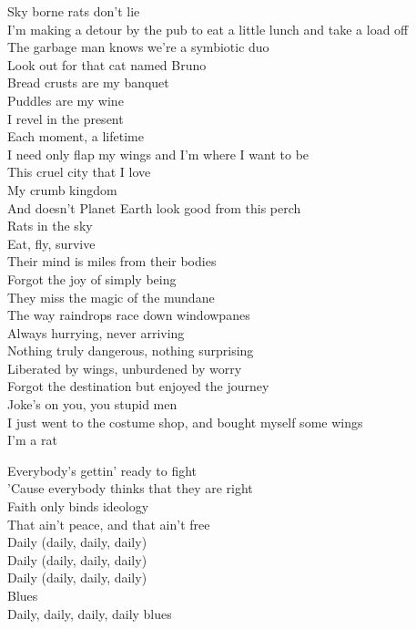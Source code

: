 Sky borne rats don't lie\\
I'm making a detour by the pub to eat a little lunch and take a load off\\
The garbage man knows we're a symbiotic duo\\
Look out for that cat named Bruno\\

Bread crusts are my banquet\\
Puddles are my wine\\
I revel in the present\\
Each moment, a lifetime\\
I need only flap my wings and I'm where I want to be\\
This cruel city that I love\\
My crumb kingdom\\
And doesn't Planet Earth look good from this perch\\
Rats in the sky\\
Eat, fly, survive\\

Their mind is miles from their bodies\\
Forgot the joy of simply being\\
They miss the magic of the mundane\\
The way raindrops race down windowpanes\\
Always hurrying, never arriving\\
Nothing truly dangerous, nothing surprising\\
Liberated by wings, unburdened by worry\\
Forgot the destination but enjoyed the journey\\

Joke's on you, you stupid men\\
I just went to the costume shop, and bought myself some wings\\
I'm a rat\\



Everybody's gettin' ready to fight\\
'Cause everybody thinks that they are right\\
Faith only binds ideology\\
That ain't peace, and that ain't free\\
Daily (daily, daily, daily)\\
Daily (daily, daily, daily)\\
Daily (daily, daily, daily)\\
Blues\\
Daily, daily, daily, daily blues\\

